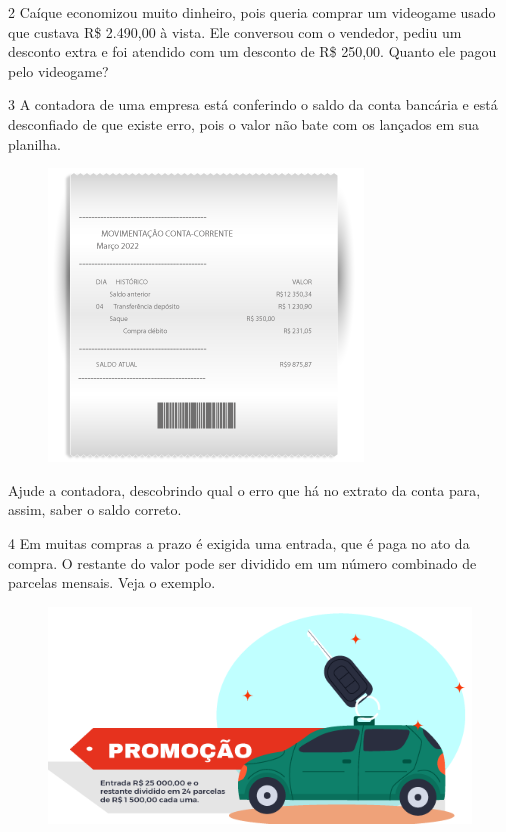 \num{2} Caíque economizou muito dinheiro, pois queria comprar um videogame
usado que custava R\$ 2.490,00 à vista. Ele conversou com o vendedor, pediu um desconto extra e foi atendido com um desconto de R\$ 250,00.
Quanto ele pagou pelo videogame?

\begin{emptybox}
\end{emptybox}


\num{3} A contadora de uma empresa está conferindo o saldo da conta
bancária e está desconfiado de que existe erro, pois o valor não bate com
os lançados em sua planilha.

\begin{figure}[htpb!]
\centering
\includegraphics[width=.45\textwidth]{../ilustracoes/MAT5/SAEB_5ANO_MAT_figura49.png}
\end{figure}\enlargethispage{3\baselineskip}

Ajude a contadora, descobrindo qual o erro que há no extrato da conta para, assim, saber o saldo correto.

\begin{emptybox}
\end{emptybox}

\num{4} Em muitas compras a prazo é exigida uma entrada, que é paga no ato
da compra. O restante do valor pode ser dividido em um número combinado
de parcelas mensais. Veja o exemplo.

\begin{figure}[htpb!]
\centering
\includegraphics[width=\textwidth]{../ilustracoes/MAT5/SAEB_5ANO_MAT_figura50.png}
\end{figure}

